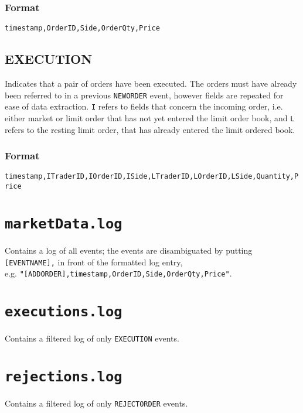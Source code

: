 \needspace{5in}
\subsubsection*{Format}
\texttt{timestamp,OrderID,Side,OrderQty,Price}

\subsection{EXECUTION}
Indicates that a pair of orders have been executed. The orders must have already been referred to in a previous \texttt{NEWORDER} event, however fields are repeated for ease of data extraction. \texttt{I} refers to fields that concern the incoming order, i.e. either market or limit order that has not yet entered the limit order book, and \texttt{L} refers to the resting limit order, that has already entered the limit ordered book.

\subsubsection*{Format}
\texttt{timestamp,ITraderID,IOrderID,ISide,LTraderID,LOrderID,LSide,Quantity,Price}

\section{\texttt{marketData.log}}
Contains a log of all events; the events are disambiguated by putting \texttt{[EVENTNAME],} in front of the formatted log entry, \\ e.g.  \texttt{"[ADDORDER],timestamp,OrderID,Side,OrderQty,Price"}.

\section{\texttt{executions.log}}
Contains a filtered log of only \texttt{EXECUTION} events.

\section{\texttt{rejections.log}}
Contains a filtered log of only \texttt{REJECTORDER} events.